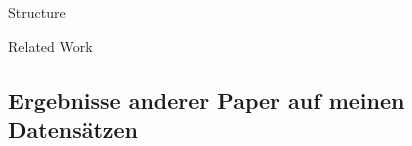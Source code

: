 \begin{chapter}{Structure}
\begin{section}{Related Work}
		\subsection{Ergebnisse anderer Paper auf meinen Datensätzen}
	\end{section}
\end{chapter}